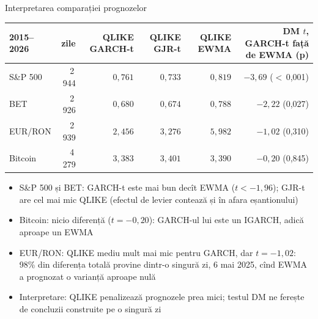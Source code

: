 \begin{frame}{Interpretarea comparației prognozelor}
\itemsize{\footnotesize}
\begin{center}
\scriptsize
\begin{tabular}{lrrrrr}
\toprule
2015--2026 & zile & QLIKE GARCH-t & QLIKE GJR-t & QLIKE EWMA & DM $t$, GARCH-t față de EWMA (p) \\
\midrule
S\&P 500 & 2\,944 & $0{,}761$ & $0{,}733$ & $0{,}819$ & ${\ensuremath{-}3{,}69}$ ($<$\,0{,}001) \\
BET & 2\,926 & $0{,}680$ & $0{,}674$ & $0{,}788$ & ${\ensuremath{-}2{,}22}$ (0{,}027) \\
EUR/RON & 2\,939 & $2{,}456$ & $3{,}276$ & $5{,}982$ & ${\ensuremath{-}1{,}02}$ (0{,}310) \\
Bitcoin & 4\,279 & $3{,}383$ & $3{,}401$ & $3{,}390$ & ${\ensuremath{-}0{,}20}$ (0{,}845) \\
\bottomrule
\end{tabular}
\end{center}
\begin{itemize}
    \item S\&P 500 și BET: GARCH-t este mai bun decît EWMA ($t < -1{,}96$); GJR-t are cel mai mic QLIKE (efectul de levier contează și în afara eșantionului)
    \item Bitcoin: nicio diferență ($t = \ensuremath{-}0{,}20$): GARCH-ul lui este un IGARCH, adică aproape un EWMA
    \item EUR/RON: QLIKE mediu mult mai mic pentru GARCH, dar $t = \ensuremath{-}1{,}02$: 98\% din diferența totală provine dintr-o singură zi, 6 mai 2025, cînd EWMA a prognozat o varianță aproape nulă
    \item Interpretare: QLIKE penalizează prognozele prea mici; testul DM ne ferește de concluzii construite pe o singură zi
\end{itemize}
\end{frame}

